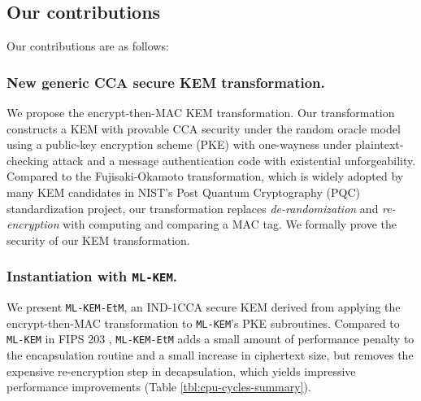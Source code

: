 \documentclass[runningheads]{llncs}
\begin{document}
\subsection{Our contributions}\label{sec:our-contributions}
Our contributions are as follows:

\subsubsection{New generic CCA secure KEM transformation.} We propose the encrypt-then-MAC KEM transformation. Our transformation constructs a KEM with provable CCA security under the random oracle model using a public-key encryption scheme (PKE) with one-wayness under plaintext-checking attack and a message authentication code with existential unforgeability. Compared to the Fujisaki-Okamoto transformation, which is widely adopted by many KEM candidates in NIST's Post Quantum Cryptography (PQC) standardization project, our transformation replaces \textit{de-randomization} and \textit{re-encryption} with computing and comparing a MAC tag. We formally prove the security of our KEM transformation.

\subsubsection{Instantiation with \texttt{ML-KEM}.} We present \texttt{ML-KEM-EtM}, an IND-1CCA secure KEM derived from applying the encrypt-then-MAC transformation to \texttt{ML-KEM}'s PKE subroutines. Compared to \texttt{ML-KEM} in FIPS 203 \cite{FIPS203}, \texttt{ML-KEM-EtM} adds a small amount of performance penalty to the encapsulation routine and a small increase in ciphertext size, but removes the expensive re-encryption step in decapsulation, which yields impressive performance improvements (Table \ref{tbl:cpu-cycles-summary}).
\end{document}
